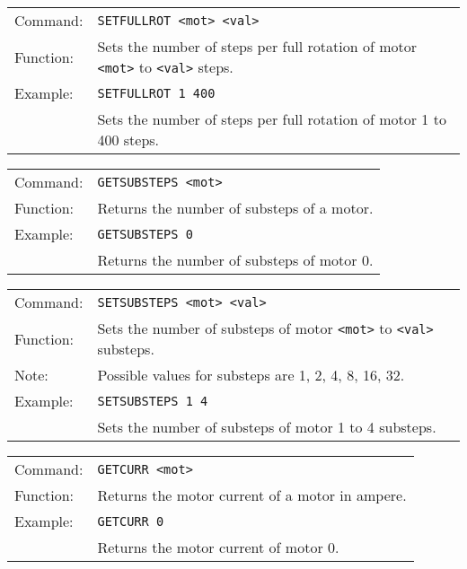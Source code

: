 \vspace{\vdistace}

\begin{table}[!htbp]
  \begin{tabularx}{\textwidth}{lX}
    Command:  & \texttt{SETFULLROT <mot> <val>}\\
    Function: & Sets the number of steps per full rotation of motor \texttt{<mot>} to \texttt{<val>} steps.\\
    Example:  & \texttt{SETFULLROT 1 400}\\
              & Sets the number of steps per full rotation of motor 1 to 400 steps.
  \end{tabularx}
\end{table}

\vspace{\vdistace}

\begin{table}[!htbp]
  \begin{tabularx}{\textwidth}{lX}
    Command:  & \texttt{GETSUBSTEPS <mot>}\\
    Function: & Returns the number of substeps of a motor.\\
    Example:  & \texttt{GETSUBSTEPS 0}\\
              & Returns the number of substeps of motor 0.
  \end{tabularx}
\end{table}

\vspace{\vdistace}

\begin{table}[!htbp]
  \begin{tabularx}{\textwidth}{lX}
    Command:  & \texttt{SETSUBSTEPS <mot> <val>}\\
    Function: & Sets the number of substeps of motor \texttt{<mot>} to \texttt{<val>} substeps.\\
    Note:     & Possible values for substeps are 1, 2, 4, 8, 16, 32.\\
    Example:  & \texttt{SETSUBSTEPS 1 4}\\
              & Sets the number of substeps of motor 1 to 4 substeps.
  \end{tabularx}
\end{table}

\vspace{\vdistace}

\begin{table}[!htbp]
  \begin{tabularx}{\textwidth}{lX}
    Command:  & \texttt{GETCURR <mot>}\\
    Function: & Returns the motor current of a motor in ampere.\\
    Example:  & \texttt{GETCURR 0}\\
              & Returns the motor current of motor 0.
  \end{tabularx}
\end{table}


